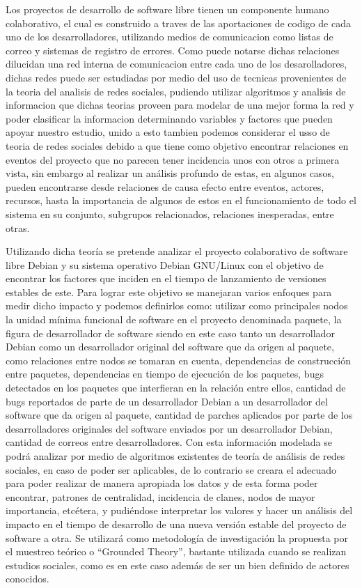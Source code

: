 \documentclass[letterpaper,12pt,titlepage]{report}
\begin{document}
Los proyectos de desarrollo de software libre tienen un componente
humano colaborativo, el cual es construido a traves de las
aportaciones de codigo de cada uno de los desarrolladores, utilizando
medios de comunicacion como listas de correo y sistemas de registro de
errores. Como puede notarse dichas relaciones dilucidan una red
interna de comunicacion entre cada uno de los desarolladores, dichas
redes puede ser estudiadas por medio del uso de tecnicas provenientes
de la teoria del analisis de redes sociales, pudiendo utilizar
algoritmos y analisis de informacion que dichas teorias proveen
para modelar de una mejor forma la red y poder clasificar la
informacion determinando variables y factores que pueden apoyar
nuestro estudio, unido a esto tambien podemos considerar el usso de teoria
de redes sociales  debido a que tiene como objetivo encontrar relaciones en eventos del proyecto que
no parecen tener incidencia unos con otros a primera vista, sin
embargo al realizar un análisis profundo de estas, en algunos casos,
pueden encontrarse desde relaciones de causa efecto entre eventos,
actores, recursos, hasta la importancia de algunos de estos en el
funcionamiento de todo el sistema en su conjunto, subgrupos
relacionados, relaciones inesperadas, entre otras.

Utilizando dicha teoría se pretende analizar el proyecto colaborativo
de software libre Debian y su sistema operativo Debian GNU/Linux con
el objetivo de encontrar los factores que inciden en el tiempo de
lanzamiento de versiones estables de este.  Para lograr este objetivo
se manejaran varios enfoques para medir dicho impacto y podemos
definirlos como: utilizar como principales nodos la unidad mínima
funcional de software en el proyecto denominada paquete, la figura de
desarrollador de software siendo en este caso tanto un desarrollador
Debian como un desarrollador original del software que da origen al
paquete, como relaciones entre nodos se tomaran en cuenta,
dependencias de construcción entre paquetes, dependencias en tiempo de
ejecución de los paquetes, bugs detectados en los paquetes que
interfieran en la relación entre ellos, cantidad de bugs reportados de
parte de un desarrollador Debian a un desarrollador del software que
da origen al paquete, cantidad de parches aplicados por parte de los
desarrolladores originales del software enviados por un desarrollador
Debian, cantidad de correos entre desarrolladores.  Con esta
información modelada se podrá analizar por medio de algoritmos
existentes de teoría de análisis de redes sociales, en caso de poder
ser aplicables, de lo contrario se creara el adecuado para poder
realizar de manera apropiada los datos y de esta forma poder
encontrar, patrones de centralidad, incidencia de clanes, nodos de
mayor importancia, etcétera, y pudiéndose interpretar los valores y
hacer un análisis del impacto en el tiempo de desarrollo de una nueva
versión estable del proyecto de software a otra.  Se utilizará como
metodología de investigación la propuesta por el muestreo teórico o
``Grounded Theory'', bastante utilizada cuando se realizan estudios
sociales, como es en este caso además de ser un bien definido de
actores conocidos.
\end{document}

